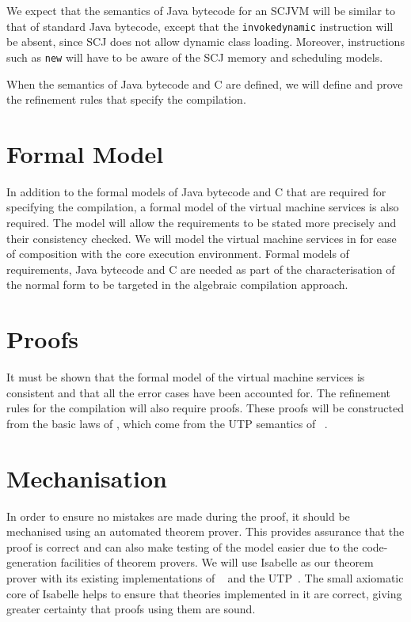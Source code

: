 \documentclass[a4paper,10pt]{report}
\begin{document}
We expect that the semantics of Java bytecode for an SCJVM will be
similar to that of standard Java bytecode, except that the
\texttt{invokedynamic} instruction will be absent, since SCJ does not
allow dynamic class loading.
Moreover, instructions such as \texttt{new} will have to be aware of
the SCJ memory and scheduling models.

When the semantics of Java bytecode and C are defined, we will define
and prove the refinement rules that specify the compilation.

\section{Formal Model}

In addition to the formal models of Java bytecode and C that are
required for specifying the compilation, a formal model of the virtual
machine services is also required.
The model will allow the requirements to be stated more precisely and
their consistency checked.
We will model the virtual machine services in \Circus{} for ease of
composition with the core execution environment.
Formal models of requirements, Java bytecode and C are needed as part
of the characterisation of the normal form to be targeted in the
algebraic compilation approach. 

\section{Proofs}

It must be shown that the formal model of the virtual machine services
is consistent and that all the error cases have been accounted for.
The refinement rules for the compilation will also require proofs.
These proofs will be constructed from the basic laws of \Circus{},
which come from the UTP semantics of \Circus{}~\cite{oliveira2009}.

\section{Mechanisation}

In order to ensure no mistakes are made during the proof, it should be
mechanised using an automated theorem prover.
This provides assurance that the proof is correct and can also make
testing of the model easier due to the code-generation facilities of
theorem provers.
We will use Isabelle as our theorem prover with its existing
implementations of \Circus{}~\cite{feliachi2012} and the
UTP~\cite{foster2015}.
The small axiomatic core of Isabelle helps to ensure that theories
implemented in it are correct, giving greater certainty that proofs
using them are sound.
\end{document}
